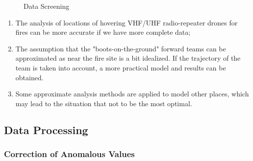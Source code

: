 \documentclass[12pt]{article}  %
\begin{document}
\begin{figure}[htbp]
    \centering    
	\caption{Data Screening} %
\end{figure}

\begin{enumerate}[\bfseries 1.]
    \setlength{\parsep}{0ex} %
    \setlength{\topsep}{0ex} %
    \setlength{\itemsep}{0ex} %
    \item The analysis of locations of hovering VHF/UHF radio-repeater drones for fires can be more accurate if we have more complete data;
    \item The assumption that the "boots-on-the-ground" forward teams can be approximated as near the fire site is a bit idealized. If the trajectory of the team is taken into account, a more practical model and results can be obtained.
    \item Some approximate analysis methods are applied to model other places, which may lead to the situation that not to be the most optimal.
\end{enumerate}

\subsection{Data Processing}

\subsubsection{Correction of Anomalous Values}
\end{document}
